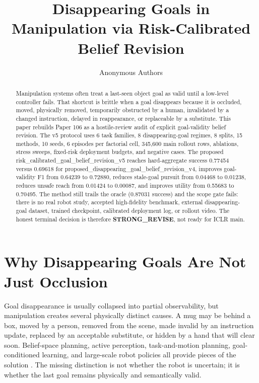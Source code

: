 \documentclass{article}
\title{Disappearing Goals in Manipulation via Risk-Calibrated Belief Revision}
\author{Anonymous Authors}
\begin{document}
\maketitle

\begin{abstract}
Manipulation systems often treat a last-seen object goal as valid until a low-level controller fails. That shortcut is brittle when a goal disappears because it is occluded, moved, physically removed, temporarily obstructed by a human, invalidated by a changed instruction, delayed in reappearance, or replaceable by a substitute. This paper rebuilds Paper 106 as a hostile-review audit of explicit goal-validity belief revision. The v5 protocol uses 6 task families, 8 disappearing-goal regimes, 8 splits, 15 methods, 10 seeds, 6 episodes per factorial cell, 345,600 main rollout rows, ablations, stress sweeps, fixed-risk deployment budgets, and negative cases. The proposed risk\_calibrated\_goal\_belief\_revision\_v5 reaches hard-aggregate success 0.77454 versus 0.69618 for proposed\_disappearing\_goal\_belief\_revision\_v4, improves goal-validity F1 from 0.64239 to 0.72880, reduces stale-goal pursuit from 0.04468 to 0.01238, reduces unsafe reach from 0.01424 to 0.00087, and improves utility from 0.55683 to 0.70495. The method still trails the oracle (0.87031 success) and the scope gate fails: there is no real robot study, accepted high-fidelity benchmark, external disappearing-goal dataset, trained checkpoint, calibrated deployment log, or rollout video. The honest terminal decision is therefore \textbf{STRONG\_REVISE}, not ready for ICLR main.
\end{abstract}

\section{Why Disappearing Goals Are Not Just Occlusion}
Goal disappearance is usually collapsed into partial observability, but manipulation creates several physically distinct causes. A mug may be behind a box, moved by a person, removed from the scene, made invalid by an instruction update, replaced by an acceptable substitute, or hidden by a hand that will clear soon. Belief-space planning, active perception, task-and-motion planning, goal-conditioned learning, and large-scale robot policies all provide pieces of the solution \citep{kaelbling2013beliefspace,garrett2020pddlstream,andrychowicz2017her,kahn2015active,zeng2021transporter}. The missing distinction is not whether the robot is uncertain; it is whether the last goal remains physically and semantically valid.
\end{document}
